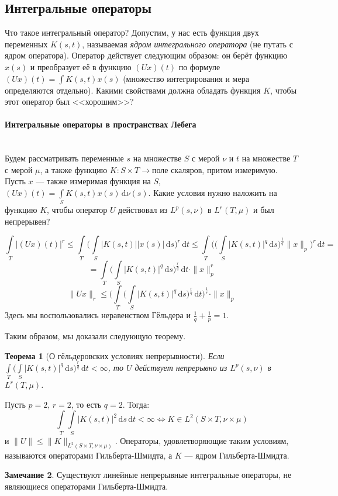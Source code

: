 \documentclass[11pt,openany,a4paper]{scrartcl}
\theoremstyle{plain}
\newtheorem{theorem}{Теорема}[subsection]
\theoremstyle{definition}
\newtheorem{remark}[theorem]{Замечание}
\newcommand\lparagraph[1]{\paragraph{#1}\mbox{}\\}
\newcommand{\dif}{\, \mathrm d}
\begin{document}
\subsection{Интегральные операторы}

Что такое интегральный оператор? Допустим, у нас есть функция двух переменных
$K(s, t)$, называемая \emph{ядром интегрального оператора} (не путать с ядром
оператора). Оператор действует следующим образом: он берёт функцию $x(s)$ и
преобразует её в функцию $(Ux)(t)$ по формуле
$(Ux)(t) = \int K(s, t) x(s)$ (множество интегрирования и мера определяются 
отдельно). Какими свойствами должна обладать функция $K$,
чтобы этот оператор был <<хорошим>>?

\lparagraph{Интегральные операторы в пространствах Лебега}

Будем рассматривать переменные $s$ на множестве $S$ с мерой $\nu$ и $t$
на множестве $T$ с мерой $\mu$, а также функцию
$K: S \times T \to \text{поле скаляров}$, притом измеримую. Пусть $x$ — также
измеримая функция на $S$, $(Ux)(t) = \int\limits_S K(s, t)x(s)\dif \nu(s)$.
Какие условия нужно наложить на функцию $K$, чтобы оператор $U$ действовал из
$L^p(s, \nu)$ в $L^r(T, \mu)$ и был непрерывен?

$$
\int\limits_T |(Ux)(t)|^r \leqslant \int\limits_T
\bigg(\int\limits_S|K(s, t)||x(s)|\dif s\bigg)^r \dif t \leqslant
\int\limits_T\bigg(\bigg(\int\limits_S |K(s, t)|^q\dif s\bigg)^\frac{1}{q}\|x\|_p\bigg)^r\dif t =
$$
$$
= \int\limits_T\bigg(\int\limits_S|K(s, t)|^q\dif s\bigg)^\frac{r}{q}\dif t \cdot \|x\|_p^r
$$
$$
\|Ux\|_r \leqslant \bigg(\int\limits_T\bigg(\int\limits_S|K(s, t)|^q\dif s\bigg)^\frac{r}{q}\dif t
\bigg)^\frac{1}{r} \cdot \|x\|_p
$$
Здесь мы воспользовались неравенством Гёльдера и $\frac{1}{q} + \frac{1}{p} = 1$.

Таким образом, мы доказали следующую теорему.

\begin{theorem}[О гёльдеровских условиях непрерывности]
    Если $\int\limits_T\bigg(\int\limits_S |K(s, t)|^q \dif s\bigg)^\frac{r}{q} \dif t
    < \infty$, то $U$ действует непрерывно из $L^p(s, \nu)$ в $L^r(T, \mu)$.
\end{theorem}

Пусть $p = 2$, $r = 2$, то есть $q = 2$. Тогда:
$$
\int\limits_T \int\limits_S |K(s, t)|^2 \dif s \dif t < \infty \iff
K \in L^2(S\times T, \nu \times \mu)
$$
и $\|U\|\leqslant \|K\|_{L^2(S\times T, \nu\times \mu)}$. Операторы, 
удовлетворяющие таким условиям, называются операторами Гильберта-Шмидта, а
$K$ — ядром Гильберта-Шмидта.
\begin{remark}
    Существуют линейные непрерывные интегральные операторы, не являющиеся
    операторами Гильберта-Шмидта.
\end{remark}
\end{document}
